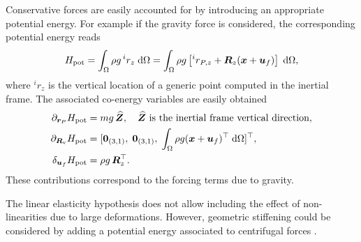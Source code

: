\documentclass{svjour3}                     %
\begin{document}
\begin{remark}
	Conservative forces are easily accounted for by introducing an appropriate potential energy. For example if the gravity force is considered, the corresponding potential energy reads
	\begin{equation*}
	H_{\text{pot}} = \int_{\Omega} \rho g \, ^i r_z \d{\Omega} = \int_{\Omega} \rho g \left[ ^i r_{P, z} +\bm{R}_z (\bm{x} + \bm{u}_f) \right] \d{\Omega},
	\end{equation*}
	where $^i r_z$ is the vertical location of a generic point computed in the inertial frame. The associated co-energy variables are easily obtained
	\begin{align*}
	\partial_{\bm{r}_P}H_{\text{pot}} &= m g \, \widehat{\bm{Z}}, \quad \text{$\widehat{\bm{Z}}$ is the inertial frame vertical direction},\\
	\partial_{\bm{R}_\text{v}}H_{\text{pot}} &= [\bm{0}_{(3, 1)}, \; \bm{0}_{(3, 1)}, \; \int_{\Omega} \rho g (\bm{x} + \bm{u}_f)^\top \d{\Omega}]^\top, \\
	\delta_{\bm{u}_f} H_{\text{pot}} &= \rho g \, \bm{R}_z^\top.
	\end{align*}
	These contributions correspond to the forcing terms due to gravity.
\end{remark}

\begin{remark}
	The linear elasticity hypothesis does not allow including the effect of non-linearities due to large deformations.  However, geometric stiffening could be considered by adding a potential energy associated to centrifugal forces \cite{MB_Daepde}. 
\end{remark}
\end{document}
